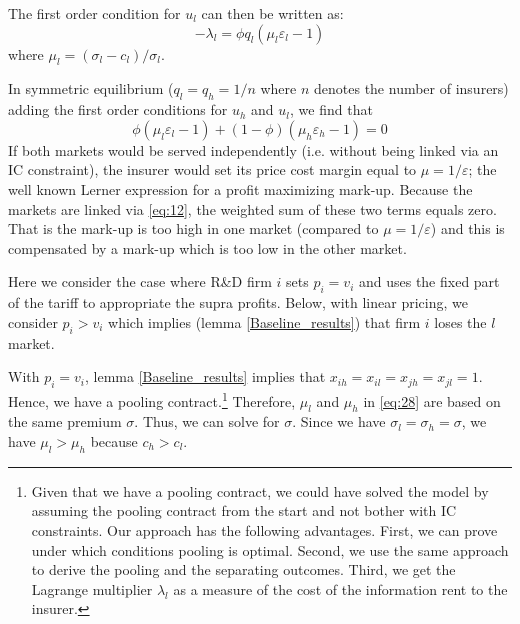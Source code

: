 \documentclass[12pt,english,a4paper]{article}
\begin{document}
The first order condition for \(u_l\) can then be written as:
\begin{equation}
\label{eq:36}
-\lambda_l = \phi q_l (\mu_l \varepsilon_l -1)
\end{equation}
where \(\mu_l=(\sigma_l-c_l)/\sigma_l\).

In symmetric equilibrium (\(q_l=q_h=1/n\) where \(n\) denotes the number of insurers) adding the first order conditions for \(u_h\) and \(u_l\), we find that
\begin{equation}
\label{eq:28}
\phi (\mu_l \varepsilon_l-1) + (1-\phi) (\mu_h \varepsilon_h -1) = 0
\end{equation}
If both markets would be served independently (i.e. without being linked via an IC constraint), the insurer would set its price cost margin equal to \(\mu = 1/\varepsilon\); the well known Lerner expression for a profit maximizing mark-up. Because the markets are linked via \eqref{eq:12}, the weighted sum of these two terms equals zero. That is the mark-up is too high in one market (compared to \(\mu=1/\varepsilon\)) and this is compensated by a mark-up which is too low in the other market.

Here we consider the case where R\&D firm \(i\) sets \(p_i=v_i\) and uses the fixed part of the tariff to appropriate the supra profits. Below, with linear pricing, we consider \(p_i>v_i\) which implies (lemma \ref{Baseline_results}) that firm \(i\) loses the \(l\) market.

With \(p_i=v_i\), lemma \ref{Baseline_results} implies that \(x_{ih}=x_{il}=x_{jh}=x_{jl}=1\). Hence, we have a pooling contract.\footnote{Given that we have a pooling contract, we could have solved the model by assuming the pooling contract from the start and not bother with IC constraints. Our approach has the following advantages. First, we can prove under which conditions pooling is optimal. Second, we use the same approach to derive the pooling and the separating outcomes. Third, we get the Lagrange multiplier \(\lambda_l\) as a measure of the cost of the information rent to the insurer.} Therefore, \(\mu_l\) and \(\mu_h\) in \eqref{eq:28} are based on the same premium \(\sigma\). Thus, we can solve for \(\sigma\). Since we have \(\sigma_l=\sigma_h=\sigma\), we have \(\mu_l > \mu_h\) because \(c_h>c_l\).
\end{document}
